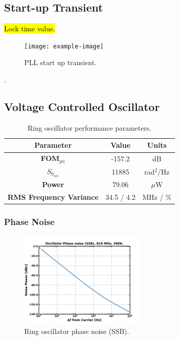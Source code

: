 \subsection{Start-up Transient}
	\hl{Lock time value.}
		\begin{figure}[htb!]
	        \centering
	        \texttt{[image: example-image]}
		    \caption{PLL start up transient.}
		    \label{fig:sim_pll_trans}
		\end{figure}
{\color{white}.}

\FloatBarrier\pagebreak
\subsection{Voltage Controlled Oscillator}\label{sec:ro_results}

		\begin{table}[htb!]
			\centering
			\def\arraystretch{1.5}		
			\setlength\arrayrulewidth{0.75pt}
			\setlength{\tabcolsep}{1em} %
			\begin{tabular}{|c|c|c|}
				\hline 
				\rule[-1ex]{0pt}{2.5ex} \cellcolor{gray!40}\textbf{Parameter} & \cellcolor{gray!40}\textbf{Value} & \cellcolor{gray!40}\textbf{Units}\\ 
				\hline 
				\rule[-1ex]{0pt}{2.5ex} \textbf{FOM$_{pn}$} & -157.2 & dB  \\ 
				\hline 
				\rule[-1ex]{0pt}{2.5ex} $S_{0_{osc}}$ &  11885 &  rad$^2$/Hz  \\ 
				\hline 
				\rule[-1ex]{0pt}{2.5ex} \textbf{Power} &  79.06 &  $\mu$W  \\ 
				\hline 
				\rule[-1ex]{0pt}{2.5ex} \textbf{RMS Frequency Variance} &  34.5 / 4.2 &  MHz / \%  \\ 
				\hline 
			\end{tabular} 
			\caption{Ring oscillator performance parameters.}
			\label{tab:ro_perf}
		\end{table}   

	\subsubsection{Phase Noise}
		\begin{figure}[htb!]
	        \centering
	        \includegraphics[width=0.55\textwidth, angle=0]{./figs/results/osc_pnoise}
		    \caption{Ring oscillator phase noise (SSB).}
		    \label{fig:ro_pnoise}
		\end{figure}
	\FloatBarrier

